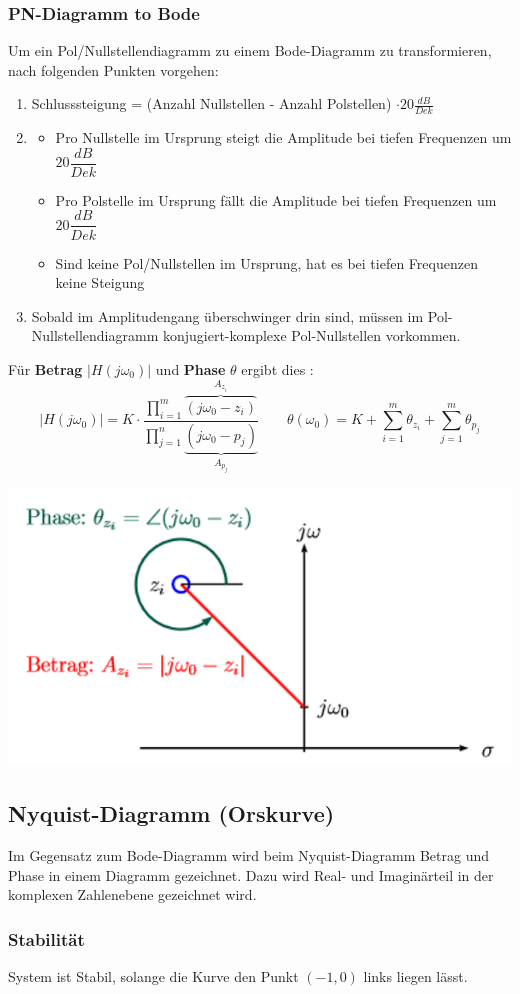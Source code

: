 \subsubsection{PN-Diagramm to Bode}
Um ein Pol/Nullstellendiagramm zu einem Bode-Diagramm zu transformieren, nach folgenden Punkten vorgehen:
\begin{enumerate}[nosep]
	\item Schlusssteigung = (Anzahl Nullstellen - Anzahl Polstellen) $\cdot 20\frac{dB}{Dek}$
	\item \begin{itemize}[nosep]
		\item Pro Nullstelle im Ursprung steigt die Amplitude bei tiefen Frequenzen um $20\dfrac{dB}{Dek}$
		\item Pro Polstelle im Ursprung fällt die Amplitude bei tiefen Frequenzen um  $20\dfrac{dB}{Dek}$
		\item Sind keine Pol/Nullstellen im Ursprung, hat es bei tiefen Frequenzen keine Steigung
	\end{itemize}
	\item Sobald im Amplitudengang überschwinger drin sind, müssen im Pol-Nullstellendiagramm konjugiert-komplexe Pol-Nullstellen vorkommen.
\end{enumerate}

Für \textbf{Betrag} $|H(j\omega_0)|$ und \textbf{Phase} $\theta$ ergibt dies :
\[
	|H(j\omega_0)| = K \cdot \frac{\prod\limits_{i=1}^{m}\overbrace{(j\omega_0 - z_i)}^{A_{z_i}}}{\prod\limits_{j=1}^{n}\underbrace{(j\omega_0 - p_j)}_{A_{p_j}}} \qquad
	\theta(\omega_0) = K + \sum_{i=1}^{m}\theta_{z_i}+ \sum_{j=1}^{m}\theta_{p_j}
\]
\begin{center}
	\includegraphics[width=0.5\columnwidth]{Images/pn-to-bode}
\end{center}


\subsection{Nyquist-Diagramm (Orskurve)}
Im Gegensatz zum Bode-Diagramm wird beim Nyquist-Diagramm Betrag und Phase in einem Diagramm gezeichnet. Dazu wird Real- und Imaginärteil in der komplexen Zahlenebene gezeichnet wird.

\subsubsection{Stabilität}
System ist Stabil, solange die Kurve den Punkt $(-1, 0)$ links liegen lässt.
